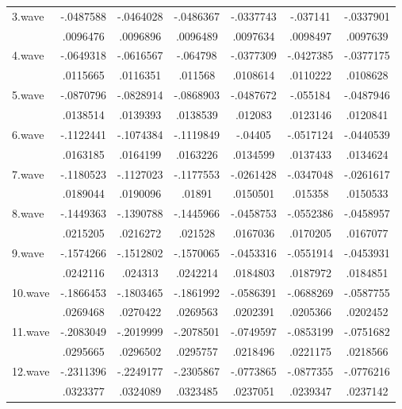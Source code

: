 {\begin{tabular}{l*{6}{c}}
3.wave      &   -.0487588&   -.0464028&   -.0486367&   -.0337743&    -.037141&   -.0337901\\
            &    .0096476&    .0096896&    .0096489&    .0097634&    .0098497&    .0097639\\
4.wave      &   -.0649318&   -.0616567&    -.064798&   -.0377309&   -.0427385&   -.0377175\\
            &    .0115665&    .0116351&     .011568&    .0108614&    .0110222&    .0108628\\
5.wave      &   -.0870796&   -.0828914&   -.0868903&   -.0487672&    -.055184&   -.0487946\\
            &    .0138514&    .0139393&    .0138539&     .012083&    .0123146&    .0120841\\
6.wave      &   -.1122441&   -.1074384&   -.1119849&     -.04405&   -.0517124&   -.0440539\\
            &    .0163185&    .0164199&    .0163226&    .0134599&    .0137433&    .0134624\\
7.wave      &   -.1180523&   -.1127023&   -.1177553&   -.0261428&   -.0347048&   -.0261617\\
            &    .0189044&    .0190096&      .01891&    .0150501&     .015358&    .0150533\\
8.wave      &   -.1449363&   -.1390788&   -.1445966&   -.0458753&   -.0552386&   -.0458957\\
            &    .0215205&    .0216272&     .021528&    .0167036&    .0170205&    .0167077\\
9.wave      &   -.1574266&   -.1512802&   -.1570065&   -.0453316&   -.0551914&   -.0453931\\
            &    .0242116&     .024313&    .0242214&    .0184803&    .0187972&    .0184851\\
10.wave     &   -.1866453&   -.1803465&   -.1861992&   -.0586391&   -.0688269&   -.0587755\\
            &    .0269468&    .0270422&    .0269563&    .0202391&    .0205366&    .0202452\\
11.wave     &   -.2083049&   -.2019999&   -.2078501&   -.0749597&   -.0853199&   -.0751682\\
            &    .0295665&    .0296502&    .0295757&    .0218496&    .0221175&    .0218566\\
12.wave     &   -.2311396&   -.2249177&   -.2305867&   -.0773865&   -.0877355&   -.0776216\\
            &    .0323377&    .0324089&    .0323485&    .0237051&    .0239347&    .0237142\\

\end{tabular}}
